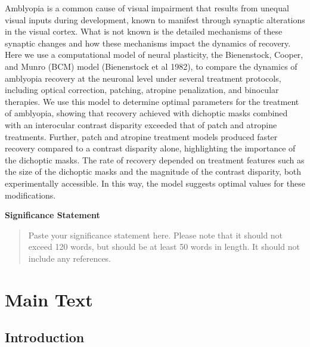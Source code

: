 \documentclass[
]{article}
\begin{document}
Amblyopia is a common cause of visual impairment that results from
unequal visual inputs during development, known to manifest through
synaptic alterations in the visual cortex. What is not known is the
detailed mechanisms of these synaptic changes and how these mechanisms
impact the dynamics of recovery. Here we use a computational model of
neural plasticity, the Bienenstock, Cooper, and Munro (BCM) model
(Bienenstock et al 1982), to compare the dynamics of amblyopia recovery
at the neuronal level under several treatment protocols, including
optical correction, patching, atropine penalization, and binocular
therapies. We use this model to determine optimal parameters for the
treatment of amblyopia, showing that recovery achieved with dichoptic
masks combined with an interocular contrast disparity exceeded that of
patch and atropine treatments. Further, patch and atropine treatment
models produced faster recovery compared to a contrast disparity alone,
highlighting the importance of the dichoptic masks. The rate of recovery
depended on treatment features such as the size of the dichoptic masks
and the magnitude of the contrast disparity, both experimentally
accessible. In this way, the model suggests optimal values for these
modifications.

\textbf{Significance Statement}

\begin{quote}
Paste your significance statement here. Please note that it should not
exceed 120 words, but should be at least 50 words in length. It should
not include any references.
\end{quote}

\section{Main Text}\label{sec:main-text}

\subsection{Introduction}\label{sec:introduction}
\end{document}
